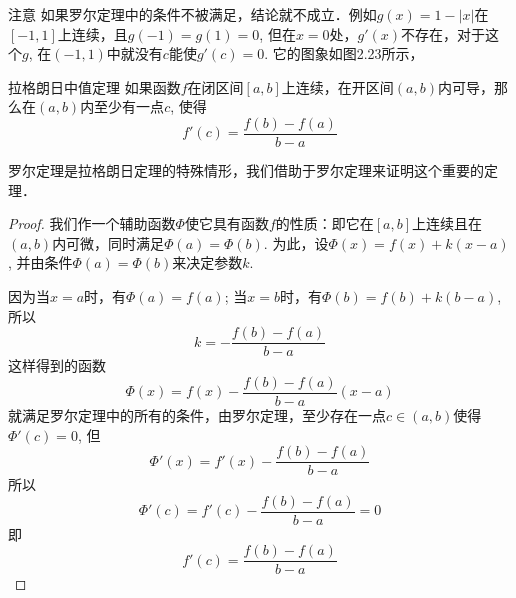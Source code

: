 \begin{figure}[htp]
    \centering
    \begin{minipage}[t]{0.48\textwidth}
    \centering
{}
    \caption{}
    \end{minipage}
    \begin{minipage}[t]{0.48\textwidth}
    \centering
    \caption{}
    \end{minipage}
    \end{figure}


\begin{rmk}
    注意 如果罗尔定理中的条件不被满足，结论就不成立．例如$g(x)=1-|x|$在$[-1, 1]$上连续，且$g(-1)=g(1)=0$, 但在$x=0$处，$g'(x)$不存在，对于这个$g$, 在$(-1,1)$中就没有$c$能使$g'(c)=0$. 它的图象如图2.23所示，
\end{rmk}

\begin{blk}
    {拉格朗日中值定理} 如果函数$f$在闭区间$[a,b]$上连续，在开区间$(a,b)$内可导，那么在$(a,b)$内至少有一点$c$, 使得
\[f'(c)=\frac{f(b)-f(a)}{b-a}\]
\end{blk}

罗尔定理是拉格朗日定理的特殊情形，我们借助于罗尔定理来证明这个重要的定理．

\begin{proof}
 我们作一个辅助函数$\Phi$使它具有函数$f$的性质：即它在$[a,b]$上连续且在$(a,b)$内可微，同时满足$\Phi (a)=\Phi (b)$. 为此，设$\Phi  (x) =f (x) +k (x-a)$, 并由条件$\Phi (a)=\Phi (b)$来决定参数$k$. 

因为当$x=a$时，有$\Phi (a)=f(a)$; 当$x=b$时，有$\Phi (b)=f(b)+k(b-a)$, 所以
\[k=-\frac{f (b) -f (a)}{b-a}\]
这样得到的函数
\[\Phi  (x) =f (x) -\frac{f (b) -f (a) }{b-a}(x-a)\]
就满足罗尔定理中的所有的条件，由罗尔定理，至少存在一点$c\in (a,b)$使得$\Phi '(c)=0$,
但
\[\Phi ' (x) =f' (x) -\frac{f (b) -f (a)}{b-a}\]
所以
\[\Phi ' (c) =f' (c) -\frac{f (b) -f (a)}{b-a} =0\]
即
\[f' (c) =\frac{f (b) -f (a)}{b-a}\]
\end{proof}

